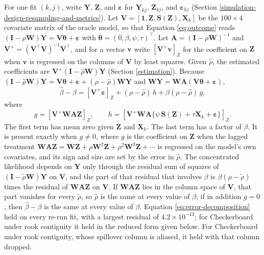 \documentclass[11pt]{article}
\begin{document}
For one fit \((k, j)\), write \(\mathbf{Y}\), \(\mathbf{Z}\), and \(\boldsymbol{\varepsilon}\) for
\(\mathbf{Y}_{kj}\), \(\mathbf{Z}_{kj}\), and \(\boldsymbol{\varepsilon}_{kj}\) (Section \ref{simulation-design-resampling-and-metrics}). Let \(\mathbf{V} = [\mathbf{1}, \mathbf{Z}, \mathbf{S}(\mathbf{Z}), \mathbf{X}_k]\) be the
\(100 \times 4\) covariate matrix of the oracle model, so that Equation
\ref{eq:outcome} reads \((\mathbf{I} - \rho \mathbf{W})\mathbf{Y} = \mathbf{V}\boldsymbol{\theta} + \boldsymbol{\varepsilon}\) with
\(\boldsymbol{\theta} = (0, \beta, \psi, \tau)^\top\). Let \(\mathbf{A} = (\mathbf{I} - \rho \mathbf{W})^{-1}\) and
\(\mathbf{V}^{+} = (\mathbf{V}^\top \mathbf{V})^{-1}\mathbf{V}^\top\), and for a vector \(\mathbf{v}\) write
\([\mathbf{V}^{+}\mathbf{v}]_Z\) for the coefficient on \(\mathbf{Z}\) when \(\mathbf{v}\) is regressed on
the columns of \(\mathbf{V}\) by least squares. Given \(\hat\rho\), the estimated
coefficients are \(\mathbf{V}^{+}(\mathbf{I} - \hat\rho \mathbf{W})\mathbf{Y}\) (Section \ref{estimation}). Because
\((\mathbf{I} - \hat\rho \mathbf{W})\mathbf{Y} = \mathbf{V}\boldsymbol{\theta} + \boldsymbol{\varepsilon} + (\rho - \hat\rho)\mathbf{W}\mathbf{Y}\) and
\(\mathbf{W}\mathbf{Y} = \mathbf{W}\mathbf{A}(\mathbf{V}\boldsymbol{\theta} + \boldsymbol{\varepsilon})\), \begin{equation}
\hat\beta - \beta = [\mathbf{V}^{+}\boldsymbol{\varepsilon}]_Z + (\rho - \hat\rho)\,h + \beta(\rho - \hat\rho)\,g,
\label{eq:error-decomposition}
\end{equation} where \[
g = [\mathbf{V}^{+}\mathbf{W}\mathbf{A}\mathbf{Z}]_Z, \qquad h = [\mathbf{V}^{+}\mathbf{W}\mathbf{A}\{\psi\,\mathbf{S}(\mathbf{Z}) + \tau \mathbf{X}_k + \boldsymbol{\varepsilon}\}]_Z.
\] The first term has mean zero given \(\mathbf{Z}\) and \(\mathbf{X}_k\). The last term
has a factor of \(\beta\). It is present exactly when \(g \neq 0\),
where \(g\) is the coefficient on \(\mathbf{Z}\) when the lagged treatment
\(\mathbf{W}\mathbf{A}\mathbf{Z} = \mathbf{W}\mathbf{Z} + \rho \mathbf{W}^2 \mathbf{Z} + \rho^2 \mathbf{W}^3 \mathbf{Z} + \cdots\) is regressed on the
model's own covariates, and its sign and size are set by the error in
\(\hat\rho\). The concentrated likelihood depends on \(\mathbf{Y}\) only through
the residual sum of squares of \((\mathbf{I} - \tilde\rho \mathbf{W})\mathbf{Y}\) on \(\mathbf{V}\), and the
part of that residual that involves \(\beta\) is
\(\beta(\rho - \tilde\rho)\) times the residual of \(\mathbf{W}\mathbf{A}\mathbf{Z}\) on \(\mathbf{V}\). If
\(\mathbf{W}\mathbf{A}\mathbf{Z}\) lies in the column space of \(\mathbf{V}\), that part vanishes for every
\(\tilde\rho\), so \(\hat\rho\) is the same at every value of \(\beta\);
if in addition \(g = 0\), then \(\hat\beta - \beta\) is the same at every
value of \(\beta\). Equation \ref{eq:error-decomposition} held on every
re-run fit, with a largest residual of \(4.2\times10^{-13}\)\iffullsi; for
Checkerboard under rook contiguity it held in the reduced form given
below\else. For Checkerboard under rook contiguity, whose spillover column is aliased, it held with that column dropped\fi.
\end{document}
